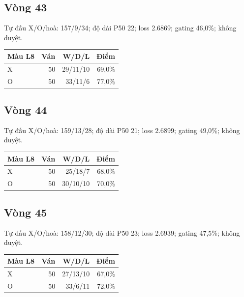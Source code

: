 \subsection*{Vòng 43}

Tự đấu X/O/hoà: 157/9/34; độ dài P50 22; loss 2.6869; gating 46,0\%; không duyệt.

\begin{center}\scriptsize\begin{tabular}{@{}lrrr@{}}\toprule

Màu L8 & Ván & W/D/L & Điểm \\

\midrule

X & 50 & 29/11/10 & 69,0\% \\

O & 50 & 33/11/6 & 77,0\% \\

\bottomrule\end{tabular}\end{center}

\subsection*{Vòng 44}

Tự đấu X/O/hoà: 159/13/28; độ dài P50 21; loss 2.6899; gating 49,0\%; không duyệt.

\begin{center}\scriptsize\begin{tabular}{@{}lrrr@{}}\toprule

Màu L8 & Ván & W/D/L & Điểm \\

\midrule

X & 50 & 25/18/7 & 68,0\% \\

O & 50 & 30/10/10 & 70,0\% \\

\bottomrule\end{tabular}\end{center}

\subsection*{Vòng 45}

Tự đấu X/O/hoà: 158/12/30; độ dài P50 23; loss 2.6939; gating 47,5\%; không duyệt.

\begin{center}\scriptsize\begin{tabular}{@{}lrrr@{}}\toprule

Màu L8 & Ván & W/D/L & Điểm \\

\midrule

X & 50 & 27/13/10 & 67,0\% \\

O & 50 & 33/6/11 & 72,0\% \\

\bottomrule\end{tabular}\end{center}

